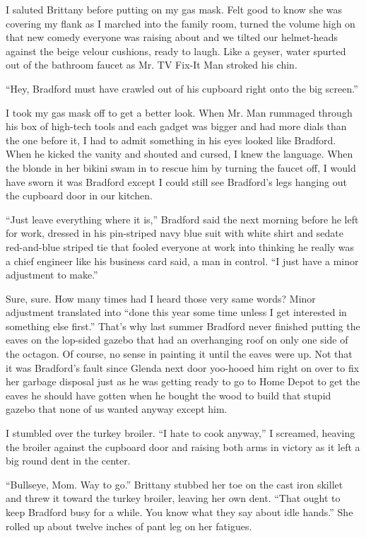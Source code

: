 \documentclass[twoside,10pt]{book}
\begin{document}
I saluted Brittany before putting on my gas mask. Felt good to know she
was covering my flank as I marched into the family room, turned the
volume high on that new comedy everyone was raising about and we tilted
our helmet-heads against the beige velour cushions, ready to laugh. Like
a geyser, water spurted out of the bathroom faucet as Mr. TV Fix-It Man
stroked his chin.

``Hey, Bradford must have crawled out of his cupboard right onto the big
screen.''

I took my gas mask off to get a better look. When Mr. Man rummaged
through his box of high-tech tools and each gadget was bigger and had
more dials than the one before it, I had to admit something in his eyes
looked like Bradford. When he kicked the vanity and shouted and cursed,
I knew the language. When the blonde in her bikini swam in to rescue him
by turning the faucet off, I would have sworn it was Bradford except I
could still see Bradford's legs hanging out the cupboard door in our
kitchen.

``Just leave everything where it is,'' Bradford said the next morning
before he left for work, dressed in his pin-striped navy blue suit with
white shirt and sedate red-and-blue striped tie that fooled everyone at
work into thinking he really was a chief engineer like his business card
said, a man in con­trol. ``I just have a minor adjustment to make.''

Sure, sure. How many times had I heard those very same words? Minor
adjustment translated into ``done this year some time unless I get
interested in something else first.'' That's why last summer Bradford
never finished putting the eaves on the lop-sided gazebo that had an
overhanging roof on only one side of the octagon. Of course, no sense in
painting it until the eaves were up. Not that it was Bradford's fault
since Glenda next door yoo-hooed him right on over to fix her garbage
disposal just as he was getting ready to go to Home Depot to get the
eaves he should have gotten when he bought the wood to build that stupid
gazebo that none of us wanted anyway except him.

I stumbled over the turkey broiler. ``I hate to cook anyway,'' I
screamed, heaving the broiler against the cupboard door and raising both
arms in victory as it left a big round dent in the center.

``Bullseye, Mom. Way to go.'' Brittany stubbed her toe on the cast iron
skillet and threw it to­ward the turkey broiler, leaving her own dent.
``That ought to keep Bradford busy for a while. You know what they say
about idle hands.'' She rolled up about twelve inches of pant leg on her
fatigues.
\end{document}
